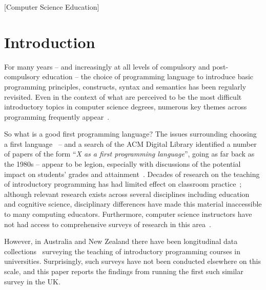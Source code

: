\documentclass{sig-alternate}
\begin{document}
[Computer Science Education]

\section{Introduction}\label{intro}

For many years -- and increasingly at all levels of compulsory and
post-compulsory education -- the choice of programming language to
introduce basic programming principles, constructs, syntax and
semantics has been regularly revisited. Even in the context of what
are perceived to be the most difficult introductory topics in computer
science degrees, numerous key themes across programming frequently
appear~\cite{dale:2006}. 

So what is a good first programming language? The issues surrounding
choosing a first language~\cite{gupta:2004,kaplan:2010} -- and a
search of the ACM Digital Library identified a number of papers of the
form ``{\emph{X as a first programming language}}'', going as far back
as the 1980s -- appear to be legion, especially with discussions of
the potential impact on students' grades and
attainment~\cite{ivanovic-et-al:2015}. Decades of research on the
teaching of introductory programming has had limited effect on
classroom practice~\cite{pears-et-al:2007}; although relevant research
exists across several disciplines including education and cognitive
science, disciplinary differences have made this material inaccessible
to many computing educators. Furthermore, computer science instructors
have not had access to comprehensive surveys of research in this
area~\cite{mccracken-et-al:2001,pears-et-al:2007}.

However, in Australia and New Zealand there have been longitudinal
data
collections~\cite{deraadt-et-al:2004,mason-et-al:2012,mason+cooper:2014}
surveying the teaching of introductory programming courses in
universities. Surprisingly, such surveys have not been conducted
elsewhere on this scale, and this paper reports the findings from
running the first such similar survey in the UK.
\end{document}

